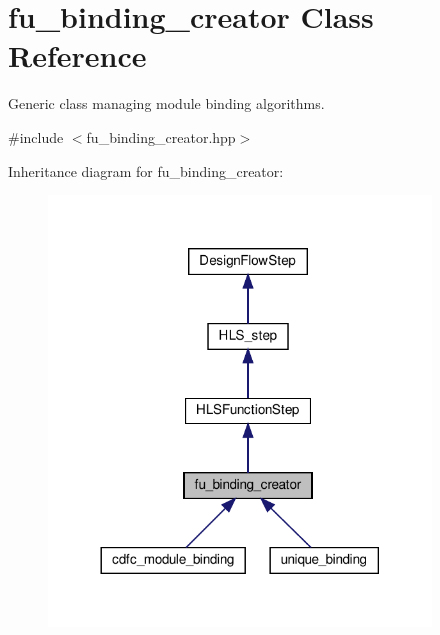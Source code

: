 \hypertarget{classfu__binding__creator}{}\section{fu\+\_\+binding\+\_\+creator Class Reference}
\label{classfu__binding__creator}


Generic class managing module binding algorithms.  




{\ttfamily \#include $<$fu\+\_\+binding\+\_\+creator.\+hpp$>$}



Inheritance diagram for fu\+\_\+binding\+\_\+creator\+:
\nopagebreak
\begin{figure}[H]
\begin{center}
\leavevmode
\includegraphics[width=288pt]{d4/d5d/classfu__binding__creator__inherit__graph}
\end{center}
\end{figure}



